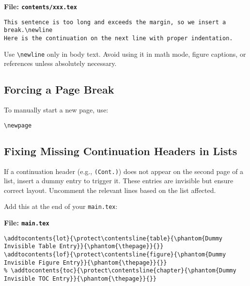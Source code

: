 \documentclass{VISTEC}
\begin{document}
\noindent\textbf{File: \texttt{contents/xxx.tex}}\vspace{-1.5em}
\begin{verbatim}
This sentence is too long and exceeds the margin, so we insert a break.\newline
Here is the continuation on the next line with proper indentation.
\end{verbatim}

\begin{subparagraph}
Use \verb|\newline| only in body text. Avoid using it in math mode, figure captions, or references unless absolutely necessary.
\end{subparagraph}

\subsection{Forcing a Page Break}

\begin{subparagraph}
To manually start a new page, use:
\end{subparagraph}

\begin{verbatim}
\newpage
\end{verbatim}

\subsection{Fixing Missing Continuation Headers in Lists}


\begin{subparagraph}
If a continuation header (e.g., \texttt{(Cont.)}) does not appear on the second page of a list, insert a dummy entry to trigger it. These entries are invisible but ensure correct layout. Uncomment the relevant lines based on the list affected.
\end{subparagraph}

\begin{subparagraph}
Add this at the end of your \texttt{main.tex}:
\end{subparagraph}

\noindent\textbf{File: \texttt{main.tex}}\vspace{-1.5em}
\begin{verbatim}
\addtocontents{lot}{\protect\contentsline{table}{\phantom{Dummy Invisible Table Entry}}{\phantom{\thepage}}{}}
\addtocontents{lof}{\protect\contentsline{figure}{\phantom{Dummy Invisible Figure Entry}}{\phantom{\thepage}}{}}
% \addtocontents{toc}{\protect\contentsline{chapter}{\phantom{Dummy Invisible TOC Entry}}{\phantom{\thepage}}{}}
\end{verbatim}
\end{document}
